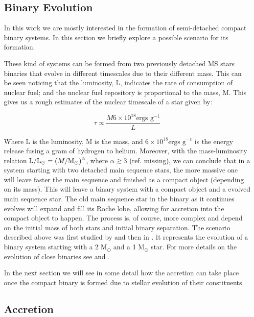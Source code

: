 \subsection{Binary Evolution}

In this work we are mostly interested in the formation of semi-detached compact binary systems. In this section we briefly explore a possible scenario for its formation. 

These kind of systems can be formed from two previously detached MS stars binaries that evolve in different timescales due to their different mass. This can be seen noticing that the luminosity, L, indicates the rate of consumption of nuclear fuel; and the nuclear fuel repository is proportional to the mass, M. This gives us a rough estimates of the nuclear timescale of a star given by:

\begin{equation}
        \tau \propto \frac{ M 6 \times 10^{18} \text{ergs g}^{-1}}{L}
\end{equation}

Where L is the luminosity, M is the mass,  and $6\times 10^{18} \text{ergs g}^{-1}$ is the energy release fusing a gram of hydrogen to helium. Moreover, with the mass-luminosity relation $ \text L / \text L _\odot = \left  (M / \text M _\odot \right )^\alpha $, where $\alpha \gtrsim 3$ (ref. missing), we can conclude that in a system starting with two detached main sequence stars, the more massive one will leave faster the main sequence and finished as a compact object (depending on its mass). This will leave a binary system with a compact object and a evolved main sequence star. The old main sequence star in the binary as it continues evolves will expand and fill its Roche lobe, allowing for accretion into the compact object to happen.  The process is, of course, more complex and depend on the initial mass of both stars and initial binary separation. The scenario described above was first studied by \cite{kippenhahn_entwicklung_1967} and then in \cite{de_loore_structure_1992}. It represents the evolution of a binary system starting with a 2 M$_\odot$  and  a 1 M$_\odot$ star. For more details on the evolution of close binaries see \cite{paczynski_evolutionary_1971} and \cite{postnov_evolution_2014}. 

In the next section we will see in some detail how the accretion can take place once the compact binary is formed due to stellar evolution of their constituents. 

\subsection{Accretion}

